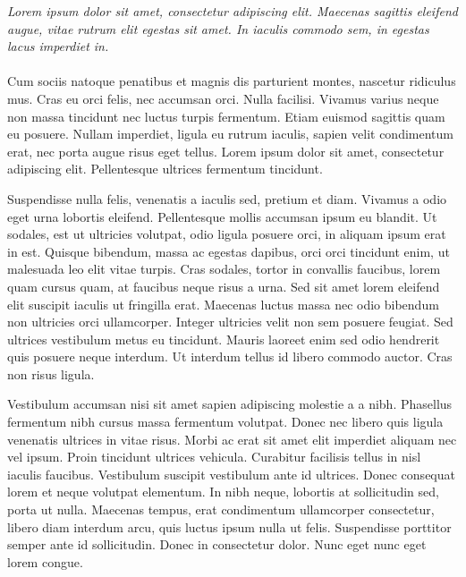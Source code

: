 \documentclass[10pt,a4paper]{article}
\begin{document}
\vspace{-1.3em}  %
\begin{multicols}{2}  %
\noindent \emph{Lorem ipsum dolor sit amet, consectetur adipiscing elit. Maecenas sagittis eleifend augue, vitae rutrum elit egestas sit amet. In iaculis commodo sem, in egestas lacus imperdiet in.}
\\
\\
Cum sociis natoque penatibus et magnis dis parturient montes, nascetur ridiculus mus. Cras eu orci felis, nec accumsan orci. Nulla facilisi. Vivamus varius neque non massa tincidunt nec luctus turpis fermentum. Etiam euismod sagittis quam eu posuere. Nullam imperdiet, ligula eu rutrum iaculis, sapien velit condimentum erat, nec porta augue risus eget tellus. Lorem ipsum dolor sit amet, consectetur adipiscing elit. Pellentesque ultrices fermentum tincidunt.

Suspendisse nulla felis, venenatis a iaculis sed, pretium et diam. Vivamus a odio eget urna lobortis eleifend. Pellentesque mollis accumsan ipsum eu blandit. Ut sodales, est ut ultricies volutpat, odio ligula posuere orci, in aliquam ipsum erat in est. Quisque bibendum, massa ac egestas dapibus, orci orci tincidunt enim, ut malesuada leo elit vitae turpis. Cras sodales, tortor in convallis faucibus, lorem quam cursus quam, at faucibus neque risus a urna. Sed sit amet lorem eleifend elit suscipit iaculis ut fringilla erat. Maecenas luctus massa nec odio bibendum non ultricies orci ullamcorper. Integer ultricies velit non sem posuere feugiat. Sed ultrices vestibulum metus eu tincidunt. Mauris laoreet enim sed odio hendrerit quis posuere neque interdum. Ut interdum tellus id libero commodo auctor. Cras non risus ligula.

Vestibulum accumsan nisi sit amet sapien adipiscing molestie a a nibh. Phasellus fermentum nibh cursus massa fermentum volutpat. Donec nec libero quis ligula venenatis ultrices in vitae risus. Morbi ac erat sit amet elit imperdiet aliquam nec vel ipsum. Proin tincidunt ultrices vehicula. Curabitur facilisis tellus in nisl iaculis faucibus. Vestibulum suscipit vestibulum ante id ultrices. Donec consequat lorem et neque volutpat elementum. In nibh neque, lobortis at sollicitudin sed, porta ut nulla. Maecenas tempus, erat condimentum ullamcorper consectetur, libero diam interdum arcu, quis luctus ipsum nulla ut felis. Suspendisse porttitor semper ante id sollicitudin. Donec in consectetur dolor. Nunc eget nunc eget lorem congue. 
\end{multicols}
\end{document}

